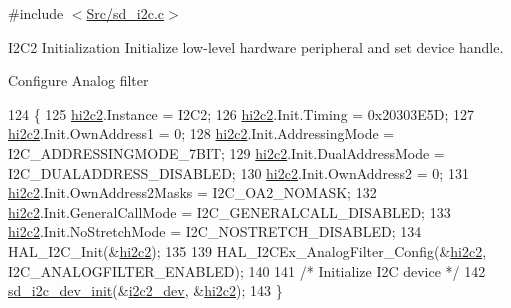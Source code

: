 {\ttfamily \#include $<$\mbox{\hyperlink{sd__i2c_8c}{Src/sd\+\_\+i2c.\+c}}$>$}



I2\+C2 Initialization Initialize low-\/level hardware peripheral and set device handle. 

Configure Analog filter
\begin{DoxyCode}
124 \{
125     \mbox{\hyperlink{group___s_d___i2_c___private___variables_gac379bcc152d860f08b1279fd3e232295}{hi2c2}}.Instance = I2C2;
126     \mbox{\hyperlink{group___s_d___i2_c___private___variables_gac379bcc152d860f08b1279fd3e232295}{hi2c2}}.Init.Timing = 0x20303E5D;
127     \mbox{\hyperlink{group___s_d___i2_c___private___variables_gac379bcc152d860f08b1279fd3e232295}{hi2c2}}.Init.OwnAddress1 = 0;
128     \mbox{\hyperlink{group___s_d___i2_c___private___variables_gac379bcc152d860f08b1279fd3e232295}{hi2c2}}.Init.AddressingMode = I2C\_ADDRESSINGMODE\_7BIT;
129     \mbox{\hyperlink{group___s_d___i2_c___private___variables_gac379bcc152d860f08b1279fd3e232295}{hi2c2}}.Init.DualAddressMode = I2C\_DUALADDRESS\_DISABLED;
130     \mbox{\hyperlink{group___s_d___i2_c___private___variables_gac379bcc152d860f08b1279fd3e232295}{hi2c2}}.Init.OwnAddress2 = 0;
131     \mbox{\hyperlink{group___s_d___i2_c___private___variables_gac379bcc152d860f08b1279fd3e232295}{hi2c2}}.Init.OwnAddress2Masks = I2C\_OA2\_NOMASK;
132     \mbox{\hyperlink{group___s_d___i2_c___private___variables_gac379bcc152d860f08b1279fd3e232295}{hi2c2}}.Init.GeneralCallMode = I2C\_GENERALCALL\_DISABLED;
133     \mbox{\hyperlink{group___s_d___i2_c___private___variables_gac379bcc152d860f08b1279fd3e232295}{hi2c2}}.Init.NoStretchMode = I2C\_NOSTRETCH\_DISABLED;
134     HAL\_I2C\_Init(&\mbox{\hyperlink{group___s_d___i2_c___private___variables_gac379bcc152d860f08b1279fd3e232295}{hi2c2}});
135 
139     HAL\_I2CEx\_AnalogFilter\_Config(&\mbox{\hyperlink{group___s_d___i2_c___private___variables_gac379bcc152d860f08b1279fd3e232295}{hi2c2}}, I2C\_ANALOGFILTER\_ENABLED);
140     
141     \textcolor{comment}{/* Initialize I2C device */}
142     \mbox{\hyperlink{group___s_d___i2_c___functions_ga5ca9adea5de20505761f892603bf8805}{sd\_i2c\_dev\_init}}(&\mbox{\hyperlink{group___s_d___i2_c___exported___variables_gaf020fc820b9c33b80b636a363fd79912}{i2c2\_dev}}, &\mbox{\hyperlink{group___s_d___i2_c___private___variables_gac379bcc152d860f08b1279fd3e232295}{hi2c2}});
143 \}
\end{DoxyCode}
\mbox{\label{group___s_d___i2_c___functions_ga5ca9adea5de20505761f892603bf8805}} 
